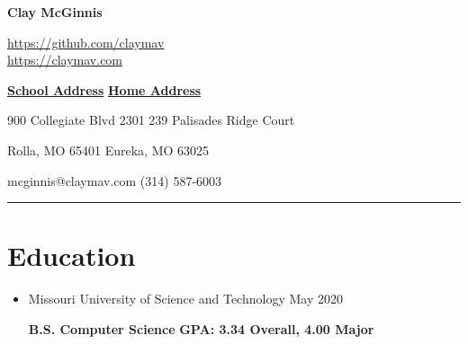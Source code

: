 \documentclass[10pt,oneside]{article}
\makeatletter
\newcommand{\name}{Clay McGinnis}
\newcommand{\phone}{(314) 587-6003}
\newcommand{\email}{mcginnis@claymav.com}
\newcommand{\github}{https://github.com/claymav}
\newcommand{\website}{https://claymav.com}
\newcommand{\cgpa}{3.34}
\newcommand{\mgpa}{4.00}
\makeatother
\begin{document}
 \selectfont

\begin{center}
\textbf{\Huge{\name}}

\Large{\url{\github}}\\
\Large{\url{\website}}
\end{center}

\underline{\textbf{School Address}}
\hfill
\underline{\textbf{Home Address}}

900 Collegiate Blvd 2301
\hfill
239 Palisades Ridge Court

Rolla, MO 65401
\hfill
Eureka, MO 63025

\email
\hfill
\phone

\vspace{0pt} \rule{\textwidth}{1pt}

\vspace*{-16pt}
\section*{Education}
\vspace*{-4pt}

\begin{itemize}
	\item[] Missouri University of Science and Technology
			\hfill
			May 2020
			
    		\textbf{B.S. Computer Science}
			\hfill
			\textbf{GPA: \cgpa{} Overall, \mgpa{} Major}
    		\end{itemize}

\vspace*{-16pt}
\end{document}
